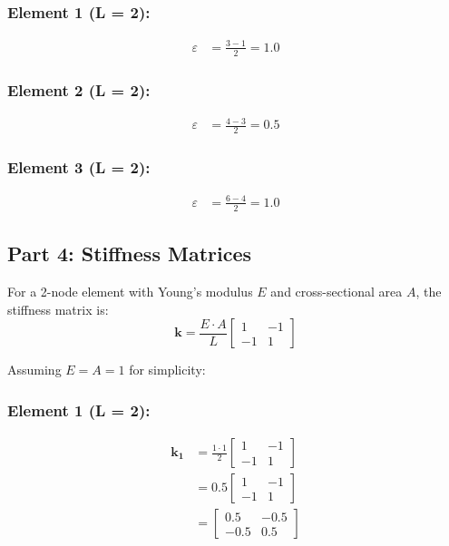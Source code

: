 \documentclass[12pt,a4paper]{article}
\begin{document}
\subsubsection*{Element 1 (L = 2):}
\begin{align}
\varepsilon &= \frac{3 - 1}{2} = 1.0
\end{align}

\subsubsection*{Element 2 (L = 2):}
\begin{align}
\varepsilon &= \frac{4 - 3}{2} = 0.5
\end{align}

\subsubsection*{Element 3 (L = 2):}
\begin{align}
\varepsilon &= \frac{6 - 4}{2} = 1.0
\end{align}

\subsection{Part 4: Stiffness Matrices}
For a 2-node element with Young's modulus $E$ and cross-sectional area $A$, the stiffness matrix is:
\begin{equation}
\mathbf{k} = \frac{E \cdot A}{L} \begin{bmatrix} 1 & -1 \\ -1 & 1 \end{bmatrix}
\end{equation}

Assuming $E = A = 1$ for simplicity:

\subsubsection*{Element 1 (L = 2):}
\begin{align}
\mathbf{k_1} &= \frac{1 \cdot 1}{2} \begin{bmatrix} 1 & -1 \\ -1 & 1 \end{bmatrix} \\
&= 0.5 \begin{bmatrix} 1 & -1 \\ -1 & 1 \end{bmatrix} \\
&= \begin{bmatrix} 0.5 & -0.5 \\ -0.5 & 0.5 \end{bmatrix}
\end{align}
\end{document}
